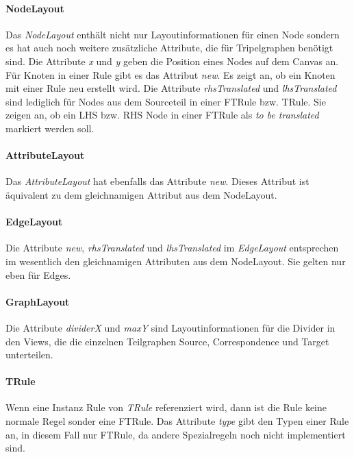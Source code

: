 \paragraph{NodeLayout}
Das \emph{NodeLayout} enthält nicht nur Layoutinformationen für einen Node sondern es hat auch noch weitere zusätzliche Attribute, die für Tripelgraphen benötigt sind. Die Attribute \emph{x} und \emph{y} geben die Position eines Nodes auf dem Canvas an. Für Knoten in einer Rule gibt es  das Attribut \emph{new}. Es zeigt an, ob ein Knoten mit einer Rule neu erstellt wird. Die Attribute \emph{rhsTranslated} und \emph{lhsTranslated} sind lediglich für Nodes aus dem Sourceteil in einer FTRule bzw. TRule. Sie zeigen an, ob ein LHS bzw. RHS Node in einer FTRule als \emph{to be translated} markiert werden soll.
\paragraph{AttributeLayout}
Das \emph{AttributeLayout} hat ebenfalls das Attribute \emph{new}. Dieses Attribut ist äquivalent zu dem gleichnamigen Attribut aus dem NodeLayout.
\paragraph{EdgeLayout}
Die Attribute \emph{new}, \emph{rhsTranslated} und \emph{lhsTranslated} im \emph{EdgeLayout} entsprechen im wesentlich den gleichnamigen Attributen aus dem NodeLayout. Sie gelten nur eben für Edges.
\paragraph{GraphLayout}
Die Attribute \emph{dividerX} und \emph{maxY} sind Layoutinformationen für die Divider in den Views, die die einzelnen Teilgraphen Source, Correspondence und Target unterteilen.
\paragraph{TRule}
Wenn eine Instanz Rule von \emph{TRule} referenziert wird, dann ist die Rule keine normale Regel sonder eine FTRule. Das Attribute \emph{type} gibt den Typen einer Rule an, in diesem Fall nur FTRule, da andere Spezialregeln noch nicht implementiert sind.
